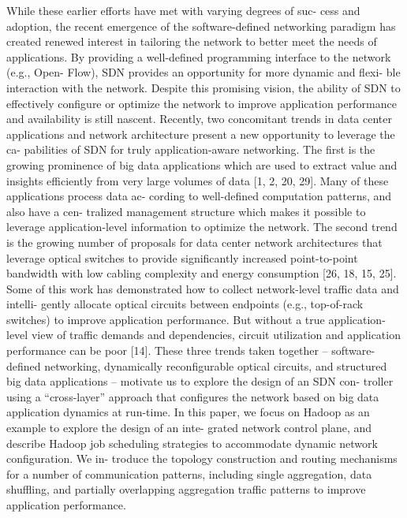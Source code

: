 \documentclass[runningheads,a4paper]{llncs}
\begin{document}
While these earlier efforts have met with varying degrees of suc- cess and adoption, the recent emergence of the software-defined networking paradigm has created renewed interest in tailoring the network to better meet the needs of applications. By providing a well-defined programming interface to the network (e.g., Open- Flow), SDN provides an opportunity for more dynamic and flexi- ble interaction with the network. Despite this promising vision, the ability of SDN to effectively configure or optimize the network to improve application performance and availability is still nascent.
Recently, two concomitant trends in data center applications and network architecture present a new opportunity to leverage the ca- pabilities of SDN for truly application-aware networking. The first is the growing prominence of big data applications which are used to extract value and insights efficiently from very large volumes of data [1, 2, 20, 29]. Many of these applications process data ac- cording to well-defined computation patterns, and also have a cen- tralized management structure which makes it possible to leverage application-level information to optimize the network. The second trend is the growing number of proposals for data center network architectures that leverage optical switches to provide significantly increased point-to-point bandwidth with low cabling complexity and energy consumption [26, 18, 15, 25]. Some of this work has demonstrated how to collect network-level traffic data and intelli- gently allocate optical circuits between endpoints (e.g., top-of-rack switches) to improve application performance. But without a true application-level view of traffic demands and dependencies, circuit utilization and application performance can be poor [14].
These three trends taken together – software-defined networking, dynamically reconfigurable optical circuits, and structured big data applications – motivate us to explore the design of an SDN con- troller using a “cross-layer” approach that configures the network based on big data application dynamics at run-time. In this paper, we focus on Hadoop as an example to explore the design of an inte- grated network control plane, and describe Hadoop job scheduling strategies to accommodate dynamic network configuration. We in- troduce the topology construction and routing mechanisms for a number of communication patterns, including single aggregation, data shuffling, and partially overlapping aggregation traffic patterns to improve application performance.
\end{document}
